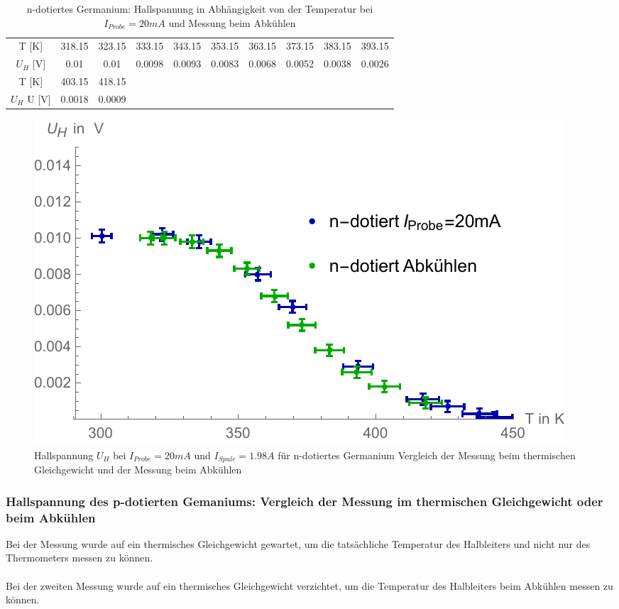 \begin{table}[H]
\centering
\begin{tabular}{|c||c|c|c|c|c|c|c|c|c|}
\hline
T [K] & 318.15 & 323.15 & 333.15 & 343.15 & 353.15 & 363.15 & 373.15 & 383.15 & 393.15  \\
 $U_{H}$ [V] & 0.01 & 0.01 & 0.0098 & 0.0093 & 0.0083 & 0.0068 & 0.0052 & 0.0038 & 0.0026 \\
 \hline
 T [K] &  403.15
   & 418.15 &  &  & & & & & \\
$U_{H}$ U [V] & 0.0018 &
   0.0009 & &  & & & & & \\
 \hline
\end{tabular}
\caption{n-dotiertes Germanium: Hallspannung in Abhängigkeit von der Temperatur bei $I_{Probe}=20mA$ und Messung beim Abkühlen}
\end{table} 

\begin{figure}[H]
	\centering
\includegraphics[width=0.9\linewidth]{IMAGE/M33_n_GleichgewichtVsAbkuel.pdf}
	\caption{Hallspannung $U_{H}$ bei $I_{Probe}=20mA$ und $I_{Spule}=1.98A$ für n-dotiertes Germanium Vergleich der Messung beim thermischen Gleichgewicht und der Messung beim Abkühlen}
	\label{fig:M3_3_3}
\end{figure} 



\subsubsection{Hallspannung des p-dotierten Gemaniums: Vergleich der Messung im thermischen Gleichgewicht oder beim Abkühlen}

Bei der Messung wurde auf ein thermisches Gleichgewicht gewartet, um die tatsächliche Temperatur des Halbleiters und nicht nur des Thermometers messen zu können.\\
\\
Bei der zweiten Messung wurde auf ein thermisches Gleichgewicht verzichtet, um die Temperatur des Halbleiters beim Abkühlen messen zu können.\\

